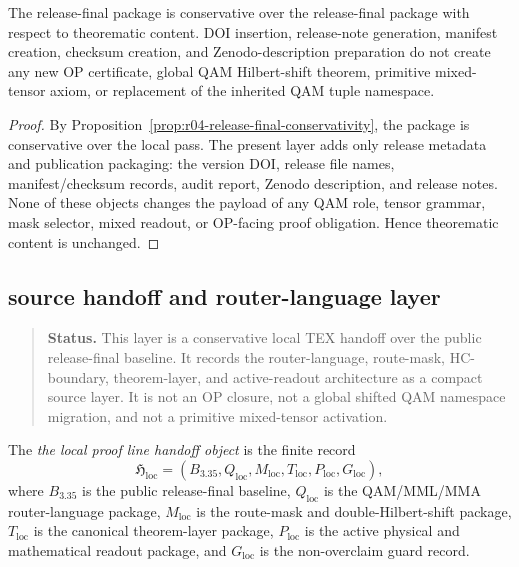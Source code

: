 \begin{proposition}
\label{prop:v3350-release-final-conservativity}
The  release-final package is conservative over the release-final package with respect to theorematic content. DOI insertion, release-note generation, manifest creation, checksum creation, and Zenodo-description preparation do not create any new OP certificate, global QAM Hilbert-shift theorem, primitive mixed-tensor axiom, or replacement of the inherited QAM tuple namespace.
\end{proposition}

\begin{proof}
By Proposition~\ref{prop:r04-release-final-conservativity}, the package is conservative over the local pass. The present layer adds only release metadata and publication packaging: the version DOI, release file names, manifest/checksum records, audit report, Zenodo description, and release notes. None of these objects changes the payload of any QAM role, tensor grammar, mask selector, mixed readout, or OP-facing proof obligation. Hence theorematic content is unchanged.
\end{proof}



\clearpage
\subsection*{source handoff and router-language layer}
\label{subsec:v3360-r16-source-handoff-router-language-layer}

\begin{quote}\small
\noindent\textbf{Status.} This  layer is a conservative local TEX handoff over the public  release-final baseline. It records the router-language, route-mask, HC-boundary, theorem-layer, and active-readout architecture as a compact source layer. It is not an OP closure, not a global shifted QAM namespace migration, and not a primitive mixed-tensor activation.
\end{quote}

\begin{definition}
\label{def:v3360-r16-handoff-object}
The \emph{the local proof line handoff object} is the finite record
\[
 \mathfrak H_{\mathrm{loc}}=(B_{3.35},Q_{\mathrm{loc}},M_{\mathrm{loc}},T_{\mathrm{loc}},P_{\mathrm{loc}},G_{\mathrm{loc}}),
\]
where $B_{3.35}$ is the public  release-final baseline, $Q_{\mathrm{loc}}$ is the QAM/MML/MMA router-language package, $M_{\mathrm{loc}}$ is the route-mask and double-Hilbert-shift package, $T_{\mathrm{loc}}$ is the canonical theorem-layer package, $P_{\mathrm{loc}}$ is the active physical and mathematical readout package, and $G_{\mathrm{loc}}$ is the non-overclaim guard record.
\end{definition}

